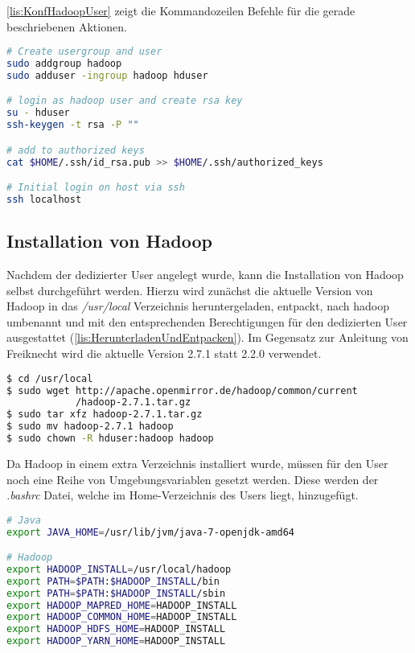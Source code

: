 \autoref{lis:KonfHadoopUser} zeigt die Kommandozeilen Befehle für die gerade beschriebenen Aktionen. \\

\begin{lstlisting}[language=bash, caption={Konfiguration des Hadoop Users}, label=lis:KonfHadoopUser]
# Create usergroup and user
sudo addgroup hadoop
sudo adduser -ingroup hadoop hduser

# login as hadoop user and create rsa key
su - hduser
ssh-keygen -t rsa -P ""

# add to authorized keys
cat $HOME/.ssh/id_rsa.pub >> $HOME/.ssh/authorized_keys

# Initial login on host via ssh
ssh localhost
\end{lstlisting}

\subsection{Installation von Hadoop}
Nachdem der dedizierter User angelegt wurde, kann die Installation von Hadoop selbst durchgeführt werden. Hierzu wird zunächst die aktuelle Version von Hadoop in das \textit{/usr/local} Verzeichnis heruntergeladen, entpackt, nach hadoop umbenannt und mit den entsprechenden Berechtigungen für den dedizierten User ausgestattet (\autoref{lis:HerunterladenUndEntpacken}). Im Gegensatz zur Anleitung von Freiknecht wird die aktuelle Version 2.7.1 statt 2.2.0 verwendet. \\

\begin{lstlisting}[language=bash, caption={Herunterladen und entpacke von Hadoop}, label=lis:HerunterladenUndEntpacken]
$ cd /usr/local
$ sudo wget http://apache.openmirror.de/hadoop/common/current
            /hadoop-2.7.1.tar.gz
$ sudo tar xfz hadoop-2.7.1.tar.gz
$ sudo mv hadoop-2.7.1 hadoop
$ sudo chown -R hduser:hadoop hadoop
\end{lstlisting}

Da Hadoop in einem extra Verzeichnis installiert wurde, müssen für den User noch eine Reihe von Umgebungsvariablen gesetzt werden. Diese werden der \textit{.bashrc} Datei, welche im Home-Verzeichnis des Users liegt, hinzugefügt. \\

\begin{lstlisting}[language=bash, caption={Umgebungsvariablen für Hadoop}, label=lis:Umgebungsvariablen]
# Java
export JAVA_HOME=/usr/lib/jvm/java-7-openjdk-amd64

# Hadoop
export HADOOP_INSTALL=/usr/local/hadoop
export PATH=$PATH:$HADOOP_INSTALL/bin
export PATH=$PATH:$HADOOP_INSTALL/sbin
export HADOOP_MAPRED_HOME=HADOOP_INSTALL
export HADOOP_COMMON_HOME=HADOOP_INSTALL
export HADOOP_HDFS_HOME=HADOOP_INSTALL
export HADOOP_YARN_HOME=HADOOP_INSTALL
\end{lstlisting}

